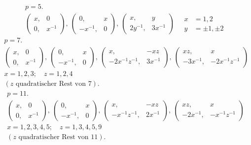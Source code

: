 \[
\begin{gathered}
p = 5.\\[2pt]
\begin{pmatrix} x, & 0 \\ 0, & x^{-1} \end{pmatrix}, \ \begin{pmatrix} 0, & x \\ -x^{-1}, & 0 \end{pmatrix}, \ \begin{pmatrix} x, & y \\ 2y^{-1}, & 3x^{-1} \end{pmatrix} \quad \begin{aligned} x &= 1, 2\\ y &= \pm 1, \pm 2 \end{aligned}
\end{gathered}
\]
\[
\begin{gathered}
p = 7.\\[2pt]
\begin{pmatrix} x, & 0 \\ 0, & x^{-1} \end{pmatrix}, \ \begin{pmatrix} 0, & x \\ -x^{-1}, & 0 \end{pmatrix}, \ \begin{pmatrix} x, & -xz \\ -2x^{-1}z^{-1}, & 3x^{-1} \end{pmatrix}, \ \begin{pmatrix} xz, & x \\ -3x^{-1}, & -2x^{-1}z^{-1} \end{pmatrix}\\[2pt]
x = 1, 2, 3; \quad z = 1, 2, 4\\
(z \text{ quadratischer Rest von } 7).
\end{gathered}
\]
\[
\begin{gathered}
p = 11.\\[2pt]
\begin{pmatrix} x, & 0 \\ 0, & x^{-1} \end{pmatrix}, \ \begin{pmatrix} 0, & x \\ -x^{-1}, & 0 \end{pmatrix}, \ \begin{pmatrix} x, & -xz \\ -x^{-1}z^{-1}, & 2x^{-1} \end{pmatrix}, \ \begin{pmatrix} xz, & x \\ -2x^{-1}, & -x^{-1}z^{-1} \end{pmatrix}\\[2pt]
x = 1, 2, 3, 4, 5; \quad z = 1, 3, 4, 5, 9\\
(z \text{ quadratischer Rest von } 11).
\end{gathered}
\]

